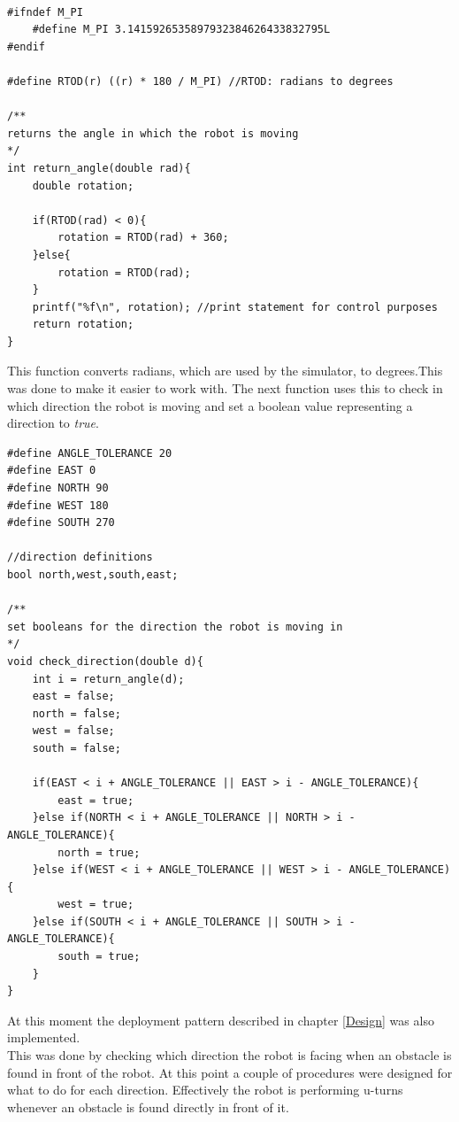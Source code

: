 \begin{lstlisting}[caption={Converting Radians to degrees}]

#ifndef M_PI
    #define M_PI 3.1415926535897932384626433832795L
#endif

#define RTOD(r) ((r) * 180 / M_PI) //RTOD: radians to degrees

/**
returns the angle in which the robot is moving
*/
int return_angle(double rad){
    double rotation;

    if(RTOD(rad) < 0){
        rotation = RTOD(rad) + 360;
    }else{
        rotation = RTOD(rad);
    }
    printf("%f\n", rotation); //print statement for control purposes
    return rotation;
}
\end{lstlisting}

This function converts radians, which are used by the simulator, to degrees.This was done to make it easier to work with.
The next function uses this to check in which direction the robot is moving and set a boolean value representing a direction to \textit{true}.

\begin{lstlisting}[caption={Early check of the movement direction}]
#define ANGLE_TOLERANCE 20
#define EAST 0
#define NORTH 90
#define WEST 180
#define SOUTH 270

//direction definitions
bool north,west,south,east;

/**
set booleans for the direction the robot is moving in
*/
void check_direction(double d){
    int i = return_angle(d);
    east = false;
    north = false;
    west = false;
    south = false;

    if(EAST < i + ANGLE_TOLERANCE || EAST > i - ANGLE_TOLERANCE){
        east = true;
    }else if(NORTH < i + ANGLE_TOLERANCE || NORTH > i - ANGLE_TOLERANCE){
        north = true;
    }else if(WEST < i + ANGLE_TOLERANCE || WEST > i - ANGLE_TOLERANCE){
        west = true;
    }else if(SOUTH < i + ANGLE_TOLERANCE || SOUTH > i - ANGLE_TOLERANCE){
        south = true;
    }
}
\end{lstlisting}

At this moment the deployment pattern described in chapter \ref{Design}  was also implemented. \\
This was done by checking which direction the robot is facing when an obstacle is found in front of the robot. At this point a couple of procedures were designed for what to do for each direction. Effectively the robot is performing u-turns whenever an obstacle is found directly in front of it.

